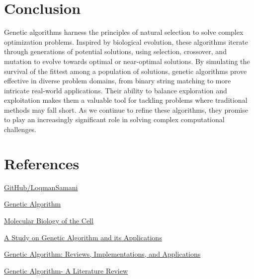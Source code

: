 \documentclass[12pt]{article}
\begin{document}
 

\section{Conclusion}

Genetic algorithms harness the principles of natural selection to solve complex optimization problems. Inspired by biological evolution, these algorithms iterate through generations of potential solutions, using selection, crossover, and mutation to evolve towards optimal or near-optimal solutions. By simulating the survival of the fittest among a population of solutions, genetic algorithms prove effective in diverse problem domains, from binary string matching to more intricate real-world applications. Their ability to balance exploration and exploitation makes them a valuable tool for tackling problems where traditional methods may fall short. As we continue to refine these algorithms, they promise to play an increasingly significant role in solving complex computational challenges.

\newpage

\section{References}


\href{https://github.com/LoqmanSamani/genetic_algorithms}{GitHub/LoqmanSamani}


\href{http://datajobstest.com/data-science-repo/Genetic-Algorithm-Guide-[Tom-Mathew].pdf}{Genetic Algorithm}



\href{https://www.amazon.de/-/en/Bruce-Alberts/dp/0393884856}{Molecular Biology of the Cell}


\href{https://scholar.google.com/scholar?hl=en&as_sdt=0\%2C5&q=A+Study+on+Genetic+Algorithm+and+its+Applications+L.+Haldurai&btnG=}{A Study on Genetic Algorithm and its Applications}

\href{https://scholar.google.com/scholar?hl=en&as_sdt=0\%2C5&q=Genetic+Algorithm\%3A+Reviews\%2C+Implementations\%2C+and+Applications+Tanweer+Alam&btnG=}{Genetic Algorithm: Reviews, Implementations, and Applications}

\href{https://scholar.google.com/scholar?hl=en&as_sdt=0\%2C5&q=Genetic+Algorithm-+A+Literature+Review+Annu+Lambora\%2C+Kunal+Gupta\%2C+Kriti+Chopra&btnG=}{Genetic Algorithm- A Literature Review}
\end{document}
